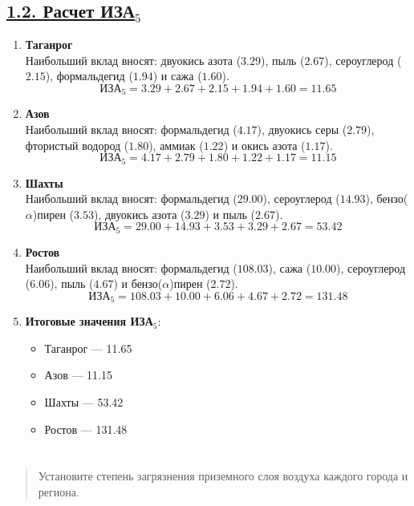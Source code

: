 \subsection*{\underline{1.2. Расчет ИЗА$_5$}}
\begin{enumerate}
    \item \textbf{Таганрог}\\
          Наибольший вклад вносят: двуокись азота ($3.29$), пыль ($2.67$), сероуглерод ($2.15$), формальдегид ($1.94$) и сажа ($1.60$).
          $$\text{ИЗА}_5 = 3.29 + 2.67 + 2.15 + 1.94 + 1.60 = 11.65$$

    \item \textbf{Азов}\\
          Наибольший вклад вносят: формальдегид ($4.17$), двуокись серы ($2.79$), фтористый водород ($1.80$), аммиак ($1.22$) и окись азота ($1.17$).
          $$\text{ИЗА}_5 = 4.17 + 2.79 + 1.80 + 1.22 + 1.17 = 11.15$$

    \item \textbf{Шахты}\\
          Наибольший вклад вносят: формальдегид ($29.00$), сероуглерод ($14.93$), бензо($\alpha$)пирен ($3.53$), двуокись азота ($3.29$) и пыль ($2.67$).
          $$\text{ИЗА}_5 = 29.00 + 14.93 + 3.53 + 3.29 + 2.67 = 53.42$$

    \item \textbf{Ростов}\\
          Наибольший вклад вносят: формальдегид ($108.03$), сажа ($10.00$), сероуглерод ($6.06$), пыль ($4.67$) и бензо($\alpha$)пирен ($2.72$).
          $$\text{ИЗА}_5 = 108.03 + 10.00 + 6.06 + 4.67 + 2.72 = 131.48$$

    \item \textbf{Итоговые значения ИЗА$_5$}:

          \begin{itemize}
              \item Таганрог --- 11.65
              \item Азов --- 11.15
              \item Шахты --- 53.42
              \item Ростов --- 131.48
          \end{itemize}
\end{enumerate}




\section*{  }
\begin{quote}
    Установите степень загрязнения приземного слоя воздуха каждого города и региона.
\end{quote}


